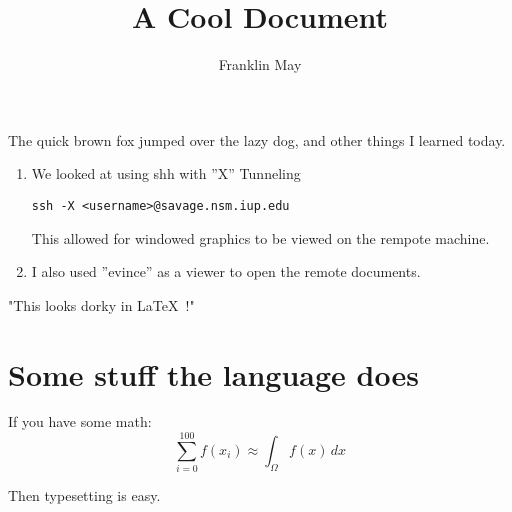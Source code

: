 \documentclass[12pt]{article}
\begin{document}
\author{Franklin May}
\title{A Cool Document}
\maketitle

The quick brown fox jumped over the lazy dog, and other things I learned today.

\begin{enumerate}
\item We looked at using shh with ''X'' Tunneling
\begin{verbatim}
ssh -X <username>@savage.nsm.iup.edu
\end{verbatim}
This allowed for windowed graphics to be viewed on the rempote machine.
\item I also used ''evince'' as a viewer to open the remote documents.


\end{enumerate}

"This looks dorky in \LaTeX\ !"
\section*{Some stuff the language does}
If you have some math:
\[ \sum_{i=0}^{100} f(x_i) \approx \int_{\Omega} f(x) \, dx \]

Then typesetting is easy.
\end{document}
